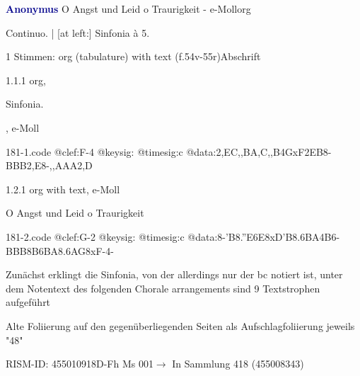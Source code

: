 \documentclass[twocolumn, 12pt]{book}
\begin{document}
\par \vspace{16pt} \textcolor{darkblue}{\textbf{Anonymus  }}\hfillplus{\textbf{[181]}}\newline O Angst und Leid o Traurigkeit - e-Moll\newline org
\par \begin{itshape}[f.54v, heading:] Continuo. | [at left:] Sinfonia à 5.\end{itshape} 
\par \textcolor{darkblue}{}  1 Stimmen: org (tabulature) with text  (f.54v-55r)\newline Abschrift
\par 1.1.1  org, \begin{itshape}Sinfonia.\end{itshape}, e-Moll  
\begin{filecontents*}{181-1.code}
@clef:F-4
@keysig:
@timesig:c
@data:2,EC,,BA,C,,B4GxF2EB8-{BBB}2,E8-{,,AAA}2,D
\end{filecontents*}
\newline %
\par 1.2.1  org with text, e-Moll\newline \begin{footnotesize} O Angst und Leid o Traurigkeit \end{footnotesize}  
\begin{filecontents*}{181-2.code}
@clef:G-2
@keysig:
@timesig:c
@data:8-{'B8.''E6E}{8xD'B8.6BA}4B6-{BBB}{8B6BA8.6AG}8xF-4-
\end{filecontents*}
\newline %
\par Zunächst erklingt die Sinfonia, von der allerdings nur der bc notiert ist, unter dem Notentext des folgenden Chorale arrangements sind 9 Textstrophen aufgeführt
\par Alte Foliierung auf den gegenüberliegenden Seiten als Aufschlagfoliierung jeweils "48"
\par RISM-ID: 455010918\newline D-Fh  Ms 001\newline $\rightarrow$ In Sammlung 418 (455008343)
      
\end{document}
